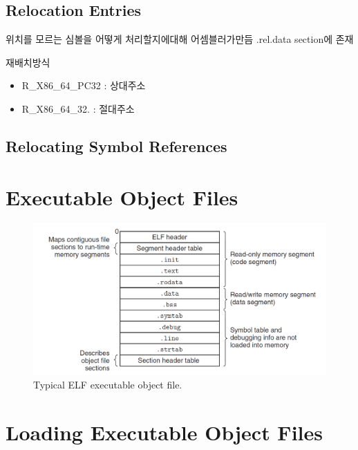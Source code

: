 \subsection{Relocation Entries}
위치를 모르는 심볼을 어떻게 처리할지에대해 어셈블러가만듬
.rel.data section에 존재

재배치방식
\begin{itemize}
    \item R\_X86\_64\_PC32 : 상대주소
    \item R\_X86\_64\_32. : 절대주소
\end{itemize}

\subsection{Relocating Symbol References}



\newpage

\section{Executable Object Files}

\begin{figure}[h!]
    \centering
    \includegraphics[scale=0.35]{pic/section7/pic4.png}
    \caption{Typical ELF executable object file.}
\end{figure}

\newpage

\section{Loading Executable Object Files}

